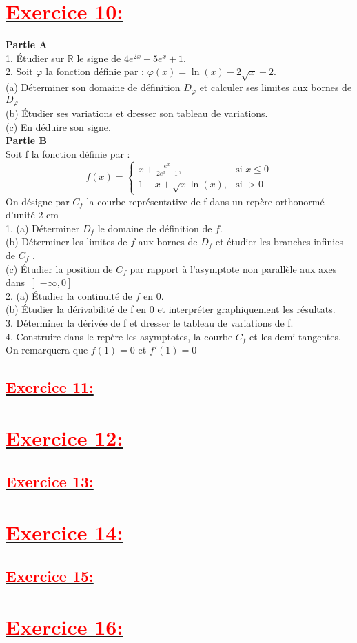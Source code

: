 \documentclass[12pt]{article}
\begin{document}
\section*{\underline{\textbf{\textcolor{red}{Exercice 10: }}}}
\textbf{Partie A}\\ 
1. Étudier sur $\mathbb{R}$ le signe de $4e^{2x}-5e^{x}+1.$\\
2. Soit $\varphi$ la fonction définie par : $\varphi(x)=\ln(x)-2\sqrt{x}+2.$\\
(a) Déterminer son domaine de définition $D_{\varphi}$ et calculer ses limites aux bornes de $D_{\varphi}$\\
(b) Étudier ses variations et dresser son tableau de variations.\\
(c) En déduire son signe.\\
\textbf{Partie B}\\
Soit f la fonction définie par :
\[f(x)=\begin{cases} 
  x+\frac{e^{x}}{2e^{x}-1}, & \text{si } x \leq 0 \\
  1-x+\sqrt{x}\ln(x), & \text{si } > 0 
\end{cases} \]
On désigne par $C_{f}$ la courbe représentative de f dans un repère orthonormé d’unité 2 cm\\
1. (a) Déterminer $D_{f}$ le domaine de définition de $f$.\\
(b) Déterminer les limites de $f$ aux bornes de $D_{f}$ et étudier les branches infinies de $C_{f}$ .\\
(c) Étudier la position de $C_{f}$ par rapport à l’asymptote non parallèle aux axes dans 
$\left] -\infty, 0\right] $\\
2. (a) Étudier la continuité de $f$ en 0.\\
(b) Étudier la dérivabilité de f en 0 et interpréter graphiquement les résultats.\\
3. Déterminer la dérivée de f et dresser le tableau de variations de f.\\
4. Construire dans le repère les asymptotes, la courbe $C_{f}$ et les demi-tangentes. On remarquera que $f(1) = 0$ et $f'(1) = 0$\\
\subsection*{\underline{\textbf{\textcolor{red}{Exercice 11:}}}}
\section*{\underline{\textbf{\textcolor{red}{Exercice 12: }}}}
\subsection*{\underline{\textbf{\textcolor{red}{Exercice 13:}}}}
\section*{\underline{\textbf{\textcolor{red}{Exercice 14: }}}}
\subsection*{\underline{\textbf{\textcolor{red}{Exercice 15:}}}}
\section*{\underline{\textbf{\textcolor{red}{Exercice 16: }}}}
\end{document}
